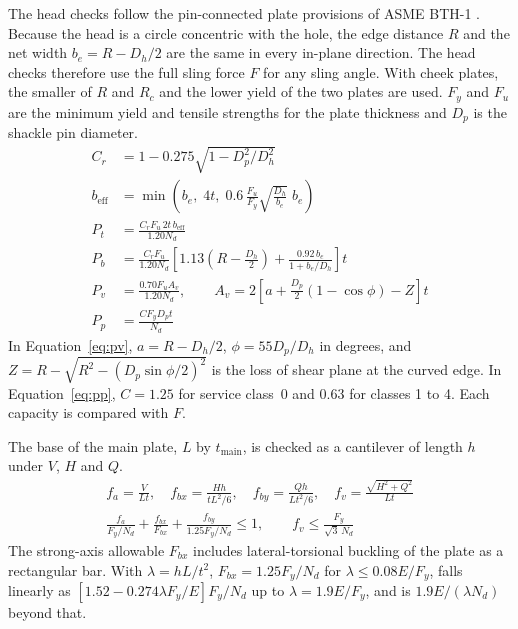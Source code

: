 The head checks follow the pin-connected plate provisions of ASME BTH-1
\cite{asmeBTH1}. Because the head is a circle concentric with the hole, the
edge distance $R$ and the net width $b_e = R - D_h/2$ are the same in every
in-plane direction. The head checks therefore use the full sling force $F$ for
any sling angle. With cheek plates, the smaller of $R$ and $R_c$ and the lower
yield of the two plates are used. $F_y$ and $F_u$ are the minimum yield and
tensile strengths for the plate thickness and $D_p$ is the shackle pin
diameter.
\begin{align}
C_r &= 1 - 0.275\sqrt{1 - D_p^2/D_h^2}
\label{eq:cr}\\
b_\text{eff} &= \min\!\left(b_e,\; 4t,\; 0.6\,\frac{F_u}{F_y}\sqrt{\frac{D_h}{b_e}}\; b_e\right)
\label{eq:beff}\\
P_t &= \frac{C_r F_u \, 2 t \, b_\text{eff}}{1.20 N_d}
\label{eq:pt}\\
P_b &= \frac{C_r F_u}{1.20 N_d}\left[1.13\left(R - \frac{D_h}{2}\right) + \frac{0.92\, b_e}{1 + b_e/D_h}\right] t
\label{eq:pb}\\
P_v &= \frac{0.70 F_u A_v}{1.20 N_d}, \qquad
A_v = 2\left[a + \frac{D_p}{2}\left(1 - \cos\phi\right) - Z\right] t
\label{eq:pv}\\
P_p &= \frac{C F_y D_p t}{N_d}
\label{eq:pp}
\end{align}
In Equation~\eqref{eq:pv}, $a = R - D_h/2$, $\phi = 55 D_p/D_h$ in degrees,
and $Z = R - \sqrt{R^2 - (D_p \sin\phi/2)^2}$ is the loss of shear plane at the
curved edge. In Equation~\eqref{eq:pp}, $C = 1.25$ for service class~0 and
$0.63$ for classes 1 to 4. Each capacity is compared with $F$.

The base of the main plate, $L$ by $t_\text{main}$, is checked as a
cantilever of length $h$ under $V$, $H$ and $Q$.
\begin{gather}
f_a = \frac{V}{L t}, \quad
f_{bx} = \frac{H h}{t L^2/6}, \quad
f_{by} = \frac{Q h}{L t^2/6}, \quad
f_v = \frac{\sqrt{H^2 + Q^2}}{L t}
\label{eq:base-stress}\\
\frac{f_a}{F_y/N_d} + \frac{f_{bx}}{F_{bx}} + \frac{f_{by}}{1.25F_y/N_d} \leq 1,
\qquad f_v \leq \frac{F_y}{\sqrt{3}\,N_d}
\label{eq:base-combined}
\end{gather}
The strong-axis allowable $F_{bx}$ includes lateral-torsional buckling of the
plate as a rectangular bar. With $\lambda = h L/t^2$, $F_{bx} = 1.25F_y/N_d$ for
$\lambda \leq 0.08E/F_y$, falls linearly as
$[1.52 - 0.274\lambda F_y/E]F_y/N_d$ up to $\lambda = 1.9E/F_y$, and is
$1.9E/(\lambda N_d)$ beyond that.

